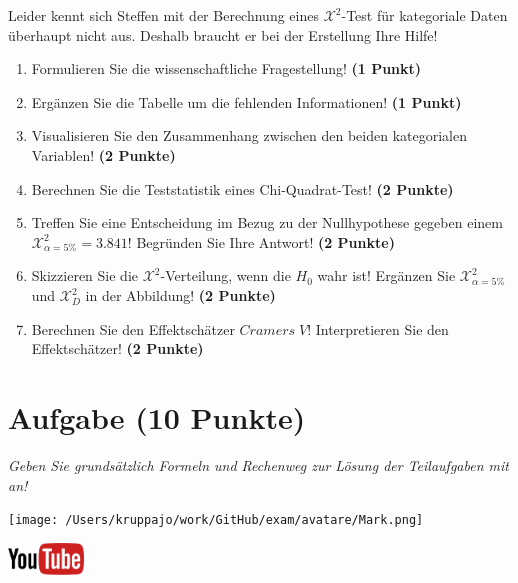 \documentclass[a4paper, 9pt]{scrartcl}\usepackage[]{graphicx}\usepackage[]{xcolor}
\begin{document}
\vspace{5Ex}

Leider kennt sich Steffen mit der Berechnung eines $\mathcal{X}^2$-Test für kategoriale Daten überhaupt nicht aus. Deshalb braucht er bei der Erstellung Ihre Hilfe!

\begin{enumerate}
\item Formulieren Sie die wissenschaftliche Fragestellung! \textbf{(1 Punkt)}
\item Ergänzen Sie die Tabelle um die fehlenden Informationen! \textbf{(1 Punkt)} 
\item Visualisieren Sie den Zusammenhang zwischen den beiden kategorialen Variablen! \textbf{(2 Punkte)}
\item Berechnen Sie die Teststatistik eines Chi-Quadrat-Test! \textbf{(2 Punkte)}
\item Treffen Sie eine Entscheidung im Bezug zu der Nullhypothese gegeben
  einem $\mathcal{X}^2_{\alpha = 5\%} = 3.841$! Begründen Sie Ihre Antwort!
  \textbf{(2 Punkte)}
\item Skizzieren Sie die $\mathcal{X}^2$-Verteilung, wenn die $H_0$ wahr ist! Ergänzen Sie  $\mathcal{X}^2_{\alpha = 5\%}$ und $\mathcal{X}^2_{D}$ in der Abbildung! \textbf{(2 Punkte)}
\item Berechnen Sie den Effektschätzer $Cramers\; V$! Interpretieren Sie den
  Effektschätzer! \textbf{(2 Punkte)}
\end{enumerate} 
\clearpage

\section{Aufgabe \hfill (10 Punkte)}

\textit{Geben Sie grundsätzlich Formeln und Rechenweg zur Lösung der Teilaufgaben mit an!} \\[1Ex]
 

 
\begin{minipage}[t]{0.5\textwidth}
\texttt{[image: /Users/kruppajo/work/GitHub/exam/avatare/Mark.png]}
\end{minipage}
\begin{minipage}[t]{0.5\textwidth}
\hfill
\href{https://youtu.be/jakM7fHyZfU}{\includegraphics[width = 2cm]{img/youtube}}\\[1Ex]
\end{minipage}
\vspace{1ex}
\end{document}
